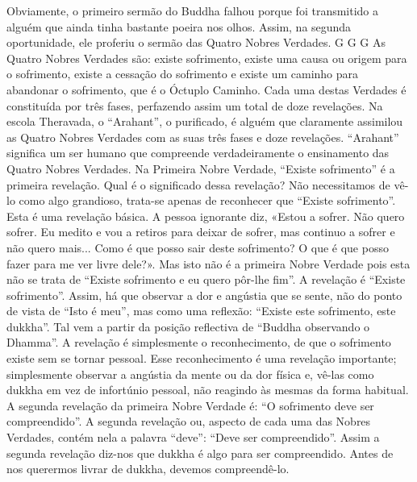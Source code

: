Obviamente, o primeiro sermão do Buddha falhou porque foi
transmitido a alguém que ainda tinha bastante poeira nos
olhos. Assim, na segunda oportunidade, ele proferiu o sermão
das Quatro Nobres Verdades.
G G G
As Quatro Nobres Verdades são: existe sofrimento,
existe uma causa ou origem para o sofrimento, existe a cessação do sofrimento e existe um caminho para abandonar o
sofrimento, que é o Óctuplo Caminho. Cada uma destas
Verdades é constituída por três fases, perfazendo assim um
total de doze revelações. Na escola Theravada, o “Arahant”,
o purificado, é alguém que claramente assimilou as Quatro
Nobres Verdades com as suas três fases e doze revelações.
“Arahant” significa um ser humano que compreende verdadeiramente o ensinamento das Quatro Nobres Verdades.
Na Primeira Nobre Verdade, “Existe sofrimento” é a
primeira revelação. Qual é o significado dessa revelação?
Não necessitamos de vê-lo como algo grandioso, trata-se apenas de reconhecer que “Existe sofrimento”. Esta é uma revelação básica. A pessoa ignorante diz, «Estou a sofrer. Não
quero sofrer. Eu medito e vou a retiros para deixar de sofrer,
mas continuo a sofrer e não quero mais... Como é que posso
sair deste sofrimento? O que é que posso fazer para me ver
livre dele?». Mas isto não é a primeira Nobre Verdade pois
esta não se trata de “Existe sofrimento e eu quero pôr-lhe
fim”. A revelação é “Existe sofrimento”.
Assim, há que observar a dor e angústia que se sente, não
do ponto de vista de “Isto é meu”, mas como uma reflexão:
“Existe este sofrimento, este dukkha”. Tal vem a partir da
posição reflectiva de “Buddha observando o Dhamma”. A
revelação é simplesmente o reconhecimento, de que o sofrimento existe sem se tornar pessoal. Esse reconhecimento é
uma revelação importante; simplesmente observar a angústia
da mente ou da dor física e, vê-las como dukkha em vez
de infortúnio pessoal, não reagindo às mesmas da forma
habitual.
A segunda revelação da primeira Nobre Verdade é: “O
sofrimento deve ser compreendido”. A segunda revelação ou,
aspecto de cada uma das Nobres Verdades, contém nela a
palavra “deve”: “Deve ser compreendido”. Assim a segunda
revelação diz-nos que dukkha é algo para ser compreendido.
Antes de nos querermos livrar de dukkha, devemos compreendê-lo.

